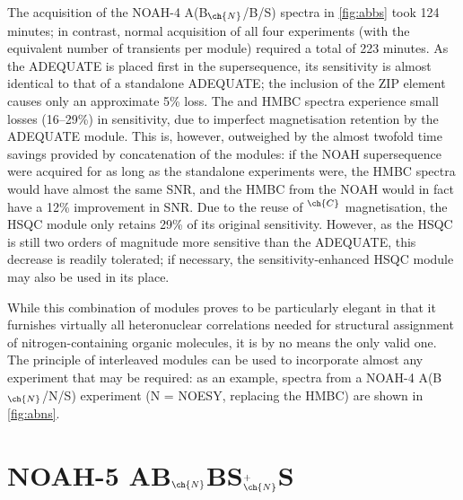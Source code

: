 \documentclass[a4paper,12pt]{article}
\newcommand{\carbon}{\ch{^{13}C}}
\newcommand{\nitrogen}{\ch{^{15}N}}
\newcommand{\magn}[1]{\ch{^1H}$^{#1}$}
\newcommand{\abnbs}{NOAH-4 A(B$_{\ch{N}}$/B/S)}
\newcommand{\abnns}{NOAH-4 A(B$_{\ch{N}}$/N/S)}
\begin{document}
\begin{refsection}
The acquisition of the \abnbs{} spectra in \cref{fig:abbs} took 124 minutes; in contrast, normal acquisition of all four experiments (with the equivalent number of transients per module) required a total of 223 minutes.
As the ADEQUATE is placed first in the supersequence, its sensitivity is almost identical to that of a standalone ADEQUATE; the inclusion of the ZIP element causes only an approximate 5\% loss.
The \nitrogen{} and \carbon{} HMBC spectra experience small losses (16--29\%) in sensitivity, due to imperfect magnetisation retention by the ADEQUATE module.
This is, however, outweighed by the almost twofold time savings provided by concatenation of the modules: if the NOAH supersequence were acquired for as long as the standalone experiments were, the \nitrogen{} HMBC spectra would have almost the same SNR, and the \carbon{} HMBC from the NOAH would in fact have a 12\% improvement in SNR.
Due to the reuse of \magn{\ch{C}} magnetisation, the HSQC module only retains 29\% of its original sensitivity.
However, as the HSQC is still two orders of magnitude more sensitive than the ADEQUATE, this decrease is readily tolerated; if necessary, the sensitivity-enhanced HSQC module\autocite{Palmer1991JMR,Kay1992JACS,Hansen2021AC,Yong2021JMR} may also be used in its place.

While this combination of modules proves to be particularly elegant in that it furnishes virtually all heteronuclear correlations needed for structural assignment of nitrogen-containing organic molecules, it is by no means the only valid one.
The principle of interleaved modules can be used to incorporate almost any experiment that may be required: as an example, spectra from a \abnns{} experiment (N = NOESY, replacing the \carbon{} HMBC) are shown in \cref{fig:abns}.

\section{NOAH-5 AB\texorpdfstring{$_{\ch{N}}$}{n}BS\texorpdfstring{$^+_{\ch{N}}$}{+n}S}


\end{refsection}
\end{document}
